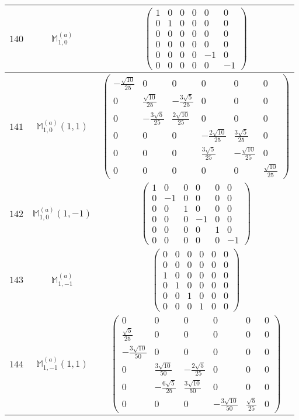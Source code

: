 \documentclass[fleqn,8pt,landscape]{jsarticle}
\begin{document}
\begin{center}
\begin{longtable}{ccc}
$ 140 $ & $ \mathbb{M}_{1,0}^{(a)} $ & $ \begin{pmatrix} 1 & 0 & 0 & 0 & 0 & 0 \\ 0 & 1 & 0 & 0 & 0 & 0 \\ 0 & 0 & 0 & 0 & 0 & 0 \\ 0 & 0 & 0 & 0 & 0 & 0 \\ 0 & 0 & 0 & 0 & -1 & 0 \\ 0 & 0 & 0 & 0 & 0 & -1 \end{pmatrix} $ \\ \hline
$ 141 $ & $ \mathbb{M}_{1,0}^{(a)}(1,1) $ & $ \begin{pmatrix} - \frac{\sqrt{10}}{25} & 0 & 0 & 0 & 0 & 0 \\ 0 & \frac{\sqrt{10}}{25} & - \frac{3 \sqrt{5}}{25} & 0 & 0 & 0 \\ 0 & - \frac{3 \sqrt{5}}{25} & \frac{2 \sqrt{10}}{25} & 0 & 0 & 0 \\ 0 & 0 & 0 & - \frac{2 \sqrt{10}}{25} & \frac{3 \sqrt{5}}{25} & 0 \\ 0 & 0 & 0 & \frac{3 \sqrt{5}}{25} & - \frac{\sqrt{10}}{25} & 0 \\ 0 & 0 & 0 & 0 & 0 & \frac{\sqrt{10}}{25} \end{pmatrix} $ \\ \hline
$ 142 $ & $ \mathbb{M}_{1,0}^{(a)}(1,-1) $ & $ \begin{pmatrix} 1 & 0 & 0 & 0 & 0 & 0 \\ 0 & -1 & 0 & 0 & 0 & 0 \\ 0 & 0 & 1 & 0 & 0 & 0 \\ 0 & 0 & 0 & -1 & 0 & 0 \\ 0 & 0 & 0 & 0 & 1 & 0 \\ 0 & 0 & 0 & 0 & 0 & -1 \end{pmatrix} $ \\ \hline
$ 143 $ & $ \mathbb{M}_{1,-1}^{(a)} $ & $ \begin{pmatrix} 0 & 0 & 0 & 0 & 0 & 0 \\ 0 & 0 & 0 & 0 & 0 & 0 \\ 1 & 0 & 0 & 0 & 0 & 0 \\ 0 & 1 & 0 & 0 & 0 & 0 \\ 0 & 0 & 1 & 0 & 0 & 0 \\ 0 & 0 & 0 & 1 & 0 & 0 \end{pmatrix} $ \\ \hline
$ 144 $ & $ \mathbb{M}_{1,-1}^{(a)}(1,1) $ & $ \begin{pmatrix} 0 & 0 & 0 & 0 & 0 & 0 \\ \frac{\sqrt{5}}{25} & 0 & 0 & 0 & 0 & 0 \\ - \frac{3 \sqrt{10}}{50} & 0 & 0 & 0 & 0 & 0 \\ 0 & \frac{3 \sqrt{10}}{50} & - \frac{2 \sqrt{5}}{25} & 0 & 0 & 0 \\ 0 & - \frac{6 \sqrt{5}}{25} & \frac{3 \sqrt{10}}{50} & 0 & 0 & 0 \\ 0 & 0 & 0 & - \frac{3 \sqrt{10}}{50} & \frac{\sqrt{5}}{25} & 0 \end{pmatrix} $ \\ \hline

\end{longtable}
\end{center}
\end{document}
